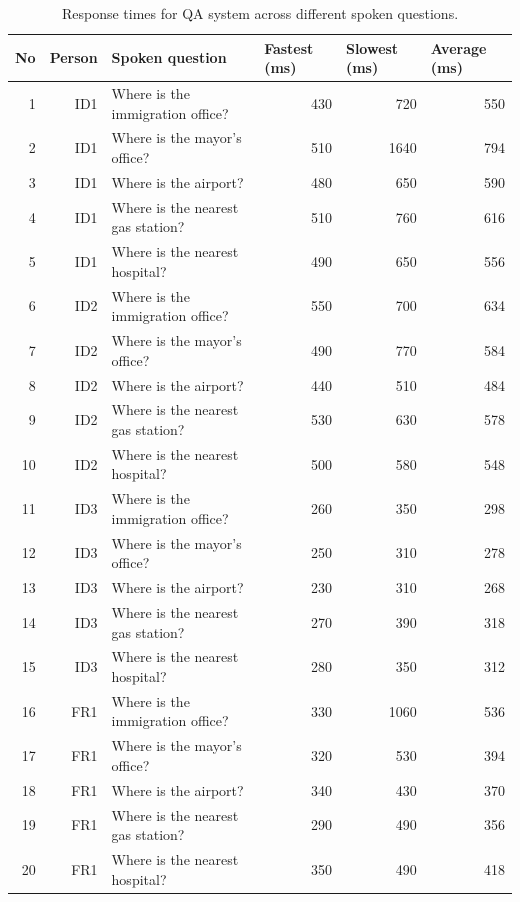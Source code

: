 \documentclass{../styles/svproc}
\begin{document}
\begin{table}[t]
	\caption{Response times for QA system across different spoken questions.}
	\label{tab:response_time} 
	\begin{center}
		\begin{tabular}{r@{\quad}r@{\quad}l@{\quad}rrr}
			\hline
			\multicolumn{1}{l}{\rule{0pt}{12pt} No} & \multicolumn{1}{l}{Person} & \multicolumn{1}{l}{Spoken question} & \multicolumn{1}{l}{Fastest (ms)} & \multicolumn{1}{l}{Slowest (ms)} & \multicolumn{1}{l}{Average (ms)} \\[2pt]
			\hline\rule{0pt}{12pt}
			1 & ID1 & Where is the immigration office? & 430 & 720 & 550 \\
			2 & ID1 & Where is the mayor's office? & 510 & 1640 & 794 \\
			3 & ID1 & Where is the airport? & 480 & 650 & 590 \\
			4 & ID1 & Where is the nearest gas station? & 510 & 760 & 616 \\
			5 & ID1 & Where is the nearest hospital? & 490 & 650 & 556 \\
			6 & ID2 & Where is the immigration office? & 550 & 700 & 634 \\
			7 & ID2 & Where is the mayor's office? & 490 & 770 & 584 \\
			8 & ID2 & Where is the airport? & 440 & 510 & 484 \\
			9 & ID2 & Where is the nearest gas station? & 530 & 630 & 578 \\
			10 & ID2 & Where is the nearest hospital? & 500 & 580 & 548 \\
			11 & ID3 & Where is the immigration office? & 260 & 350 & 298 \\
			12 & ID3 & Where is the mayor's office? & 250 & 310 & 278 \\
			13 & ID3 & Where is the airport? & 230 & 310 & 268 \\
			14 & ID3 & Where is the nearest gas station? & 270 & 390 & 318 \\
			15 & ID3 & Where is the nearest hospital? & 280 & 350 & 312 \\
			16 & FR1 & Where is the immigration office? & 330 & 1060 & 536 \\
			17 & FR1 & Where is the mayor's office? & 320 & 530 & 394 \\
			18 & FR1 & Where is the airport? & 340 & 430 & 370 \\
			19 & FR1 & Where is the nearest gas station? & 290 & 490 & 356 \\
			20 & FR1 & Where is the nearest hospital? & 350 & 490 & 418 \\

\end{tabular}
\end{center}
\end{table}
\end{document}

